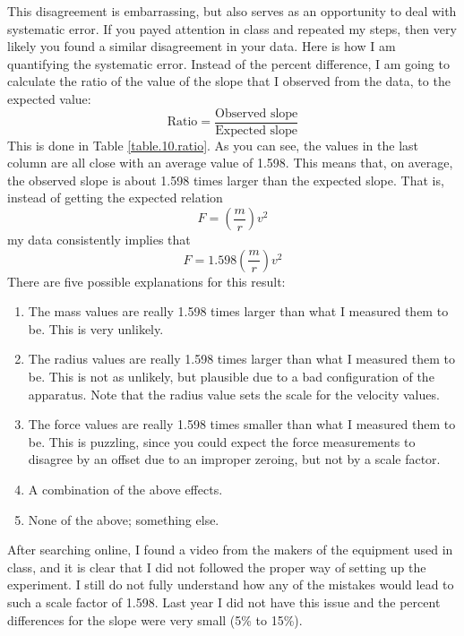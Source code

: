 This disagreement is embarrassing, but also serves as an opportunity to deal with systematic error. If you payed attention in class and repeated my steps, then very likely you found a similar disagreement in your data. Here is how I am quantifying the systematic error. Instead of the percent difference, I am going to calculate the ratio of the value of the slope that I observed from the data, to the expected value:
\begin{equation}
    \text{Ratio} = \frac{\text{Observed slope}}{\text{Expected slope}}
\end{equation}
This is done in Table \ref{table.10.ratio}. As you can see, the values in the last column are all close with an average value of 1.598. This means that, on average, the observed slope is about 1.598 times larger than the expected slope. That is, instead of getting the expected relation
\begin{equation}
    F = \left( \frac{m}{r} \right) v^{2}
\end{equation}
my data consistently implies that
\begin{equation}
    F = 1.598 \left( \frac{m}{r} \right) v^{2}
\end{equation}
There are five possible explanations for this result:
\begin{enumerate}
    \item The mass values are really 1.598 times larger than what I measured them to be. This is very unlikely.
    \item The radius values are really 1.598 times larger than what I measured them to be. This is not as unlikely, but plausible due to a bad configuration of the apparatus. Note that the radius value sets the scale for the velocity values.
    \item The force values are really 1.598 times smaller than what I measured them to be. This is puzzling, since you could expect the force measurements to disagree by an offset due to an improper zeroing, but not by a scale factor.
    \item A combination of the above effects.
    \item None of the above; something else.
\end{enumerate}
After searching online, I found a video from the makers of the equipment used in class, and it is clear that I did not followed the proper way of setting up the experiment. I still do not fully understand how any of the mistakes would lead to such a scale factor of 1.598. Last year I did not have this issue and the percent differences for the slope were very small (5\% to 15\%).

